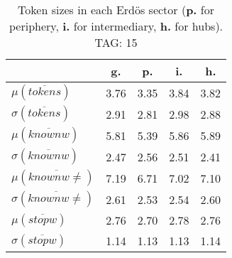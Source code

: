 \begin{table}[h!]
\begin{center}
\begin{tabular}{| l | c | c | c | c |}\hline
 & g. & p. & i. & h. \\\hline
$\mu(\overline{tokens})$ & 3.76  & 3.35  & 3.84  & 3.82 \\\hline
$\sigma(\overline{tokens})$ & 2.91  & 2.81  & 2.98  & 2.88 \\\hline
$\mu(\overline{knownw})$ & 5.81  & 5.39  & 5.86  & 5.89 \\\hline
$\sigma(\overline{knownw})$ & 2.47  & 2.56  & 2.51  & 2.41 \\\hline
$\mu(\overline{knownw \neq})$ & 7.19  & 6.71  & 7.02  & 7.10 \\\hline
$\sigma(\overline{knownw \neq})$ & 2.61  & 2.53  & 2.54  & 2.60 \\\hline
$\mu(\overline{stopw})$ & 2.76  & 2.70  & 2.78  & 2.76 \\\hline
$\sigma(\overline{stopw})$ & 1.14  & 1.13  & 1.13  & 1.14 \\\hline
\end{tabular}
\caption{Token sizes in each Erd\"os sector ({{\bf p.}} for periphery, {{\bf i.}} for intermediary, {{\bf h.}} for hubs). TAG: 15}
\end{center}
\end{table}